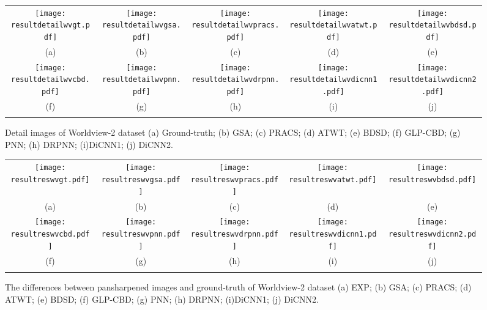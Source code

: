 \documentclass[journal]{IEEEtran}
\begin{document}
\begin{figure*}[t]\scriptsize
\centering
\begin{tabular}{ccccc}
\texttt{[image: resultdetailwvgt.pdf]} &
\texttt{[image: resultdetailwvgsa.pdf]} &
\texttt{[image: resultdetailwvpracs.pdf]} &
\texttt{[image: resultdetailwvatwt.pdf]} &
\texttt{[image: resultdetailwvbdsd.pdf]} \\
(a) & (b) & (c) &(d) &(e)  \\
\texttt{[image: resultdetailwvcbd.pdf]} &
\texttt{[image: resultdetailwvpnn.pdf]} &
\texttt{[image: resultdetailwvdrpnn.pdf]} &
\texttt{[image: resultdetailwvdicnn1.pdf]} &
\texttt{[image: resultdetailwvdicnn2.pdf]} \\
(f) & (g) &(h) &(i) &(j) \\
\\
\end{tabular}
\caption{Detail images of Worldview-2 dataset (a) Ground-truth; (b) GSA; (c) PRACS; (d) ATWT; (e) BDSD; (f) GLP-CBD; (g) PNN; (h) DRPNN; (i)DiCNN1; (j) DiCNN2.}
\label{figure:detailimage:wv}
\end{figure*}

\begin{figure*}[t]\scriptsize
\centering
\begin{tabular}{ccccc}
\texttt{[image: resultreswvgt.pdf]} &
\texttt{[image: resultreswvgsa.pdf]} &
\texttt{[image: resultreswvpracs.pdf]} &
\texttt{[image: resultreswvatwt.pdf]} &
\texttt{[image: resultreswvbdsd.pdf]} \\
(a) & (b) & (c) &(d) &(e)  \\
\texttt{[image: resultreswvcbd.pdf]} &
\texttt{[image: resultreswvpnn.pdf]} &
\texttt{[image: resultreswvdrpnn.pdf]} &
\texttt{[image: resultreswvdicnn1.pdf]} &
\texttt{[image: resultreswvdicnn2.pdf]} \\
(f) & (g) &(h) &(i) &(j) \\
\\
\end{tabular}
\caption{The differences between pansharpened images and ground-truth of Worldview-2 dataset (a) EXP; (b) GSA; (c) PRACS; (d) ATWT; (e) BDSD; (f) GLP-CBD; (g) PNN; (h) DRPNN; (i)DiCNN1; (j) DiCNN2.}
\label{figure:resimage:wv}
\end{figure*}
\end{document}
